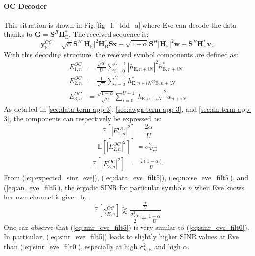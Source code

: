 \documentclass[journal,comsoc]{IEEEtran}
\newcommand{\module}[1]{\left|#1\right|}
\newcommand{\EX}[1]{\mathbb{E} \left[#1\right]}%
\newcommand{\HE}{\textbf{H}_{\text{E}}}
\newcommand{\HB}{\textbf{H}_{\text{B}}}
\newcommand{\ve}{\textbf{v}_{\text{E}}}
\newcommand{\spread}{\textbf{S}}
\newcommand{\w}{\textbf{w}}
\begin{document}
\paragraph{OC Decoder}
\label{sec:own-channel-knowledge}
This situation is shown in Fig.\ref{fig_ff_tdd_a} where Eve can decode the data thanks to $\textbf{G} = \spread^H \HE^*$. The received sequence is:
\begin{equation}
	\textbf{y}_{\text{E}}^{OC} = \sqrt{\alpha} \spread^H \module{\HE}^2 \HB^* \spread\textbf{x} +  \sqrt{1-\alpha} \spread^H \module{\HE}^2 \w  +  \spread^H  \HE^*  \ve
	\label{eq:rx_eve_filt5}
\end{equation}
With this decoding structure, the received symbol components are defined as:
\begin{equation}
\begin{split}
E_{1,n}^{OC} &= \frac{\sqrt{\alpha}}{U}\sum_{i=0}^{U-1}  \left|h_{\text{E}, n + iN}\right|^2  h_{\text{B}, n + iN}^* \\
E_{2,n}^{OC} &= \frac{1}{\sqrt{U}}\sum_{i=0}^{U-1} h^*_{\text{E}, n + iN}  v_{\text{E}, n + iN}\\
E_{3,n}^{OC} &=\frac{ \sqrt{1-\alpha}  }{\sqrt{U}}\sum_{i=0}^{U-1}   \left|h_{\text{E}, n + iN}\right|^2 w_{n + iN}
\end{split}
\end{equation}
As detailed in  \ref{sec:data-term-app-3},  \ref{sec:awgn-term-app-3}, and \ref{sec:an-term-app-3}, the components can respectively be expressed as:
\begin{equation}
\EX{|E_{1,n}^{OC}|^2} = \frac{2\alpha}{U}
\label{eq:data_eve_filt5}
\end{equation}
\begin{equation}
\begin{split}
\EX{|E_{2,n}^{OC}|^2} &= \sigma^2_{\text{V,E}}
\end{split}
\label{eq:noise_eve_filt5}
\end{equation}
\begin{equation}
\begin{split}
\EX{|E_{3,n}^{OC}|^2}  &=  \frac{2(1-\alpha)}{U}
\end{split}
\label{eq:an_eve_filt5}
\end{equation}
From (\ref{eq:expected_sinr_eve}), (\ref{eq:data_eve_filt5}), (\ref{eq:noise_eve_filt5}), and (\ref{eq:an_eve_filt5}),  the ergodic SINR for particular symbols $n$ when Eve knows her own channel is given by:
\begin{equation}
\EX{\gamma_{E,n}^{OC}} \gtrapprox \frac{\frac{\alpha }{U}}{\frac{\sigma^2_{\text{V,E}}}{2} + \frac{1-\alpha}{U}}
\label{eq:sinr_eve_filt5}
\end{equation}
One can observe that (\ref{eq:sinr_eve_filt5}) is very similar to (\ref{eq:sinr_eve_filt0}). In particular, (\ref{eq:sinr_eve_filt5}) leads to slightly higher SINR values at Eve than (\ref{eq:sinr_eve_filt0}), especially at high $\sigma^2_{\text{V,E}}$ and high $\alpha$. 
\end{document}
